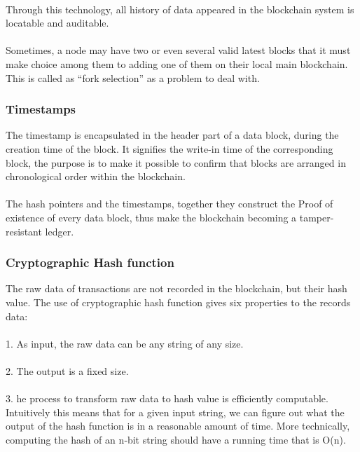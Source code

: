 \documentclass[]{article}
\begin{document}
\begin{CJK*}{UTF8}{gbsn}
\paragraph{} 
Through this technology, all history of data appeared in the blockchain system is locatable and auditable.
\paragraph{} 
Sometimes, a node may have two or even several valid latest blocks that it must make choice among them to adding one of them on their local main blockchain. This is called as ``fork selection'' as a problem to deal with.
\subsubsection*{Timestamps}
The timestamp is encapsulated in the header part of a data block, during the creation time of the block. It signifies the write-in time of the corresponding block, the purpose is to make it possible to confirm that blocks are arranged in chronological order within the blockchain.
\paragraph{} 
The hash pointers and the timestamps, together they construct the Proof of existence of every data block, thus make the blockchain becoming a tamper-resistant ledger. 
\subsubsection*{Cryptographic Hash function}
The raw data of transactions are not recorded in the blockchain, but their hash value. The use of cryptographic hash function gives six properties to the records data:
\paragraph{}  1. As input, the raw data can be any string of any size.
\paragraph{}  2. The output is a fixed size.
\paragraph{}  3. he process to transform raw data to hash value is efficiently computable. Intuitively this means that for a given input string, we can figure out what the output of the hash function is in a reasonable amount of time. More technically, computing the hash of an n‐bit string should have a running time that is O(n).

\end{CJK*}
\end{document}

